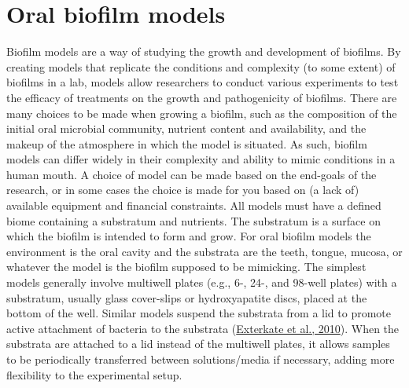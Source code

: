 \documentclass[
  letterpaper,
]{book}
\begin{document}
\hypertarget{background-biofilm-models}{%
\section{Oral biofilm models}\label{background-biofilm-models}}

Biofilm models are a way of studying the growth and development of
biofilms. By creating models that replicate the conditions and
complexity (to some extent) of biofilms in a lab, models allow
researchers to conduct various experiments to test the efficacy of
treatments on the growth and pathogenicity of biofilms. There are many
choices to be made when growing a biofilm, such as the composition of
the initial oral microbial community, nutrient content and availability,
and the makeup of the atmosphere in which the model is situated. As
such, biofilm models can differ widely in their complexity and ability
to mimic conditions in a human mouth. A choice of model can be made
based on the end-goals of the research, or in some cases the choice is
made for you based on (a lack of) available equipment and financial
constraints. All models must have a defined biome containing a
substratum and nutrients. The substratum is a surface on which the
biofilm is intended to form and grow. For oral biofilm models the
environment is the oral cavity and the substrata are the teeth, tongue,
mucosa, or whatever the model is the biofilm supposed to be mimicking.
The simplest models generally involve multiwell plates (e.g., 6-, 24-,
and 98-well plates) with a substratum, usually glass cover-slips or
hydroxyapatite discs, placed at the bottom of the well. Similar models
suspend the substrata from a lid to promote active attachment of
bacteria to the substrata
(\protect\hyperlink{ref-extercateAAA2010}{Exterkate et al., 2010}). When
the substrata are attached to a lid instead of the multiwell plates, it
allows samples to be periodically transferred between solutions/media if
necessary, adding more flexibility to the experimental setup.
\end{document}
